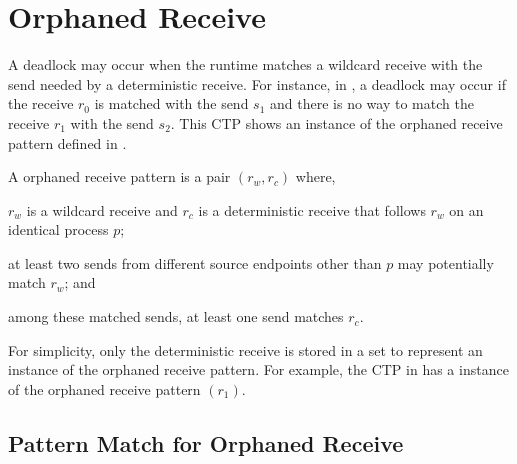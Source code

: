 \section{Orphaned Receive}


\examplefigone

A deadlock may occur when the runtime matches a wildcard receive with the send needed by a deterministic receive. For instance, in , a deadlock may occur if the receive $\mathit{r_{0}}$ is matched with the send $\mathit{s_{1}}$ and there is no way to match the receive $\mathit{r_{1}}$ with the send $\mathit{s_{2}}$. This CTP shows an instance of the orphaned receive pattern defined in .

\begin{definition}
A orphaned receive pattern is a pair $(\mathit{r_w}, \mathit{r_c})$ where, 
\begin{compactenum}
\item $\mathit{r_w}$ is a wildcard receive and $\mathit{r_c}$ is a deterministic receive that follows $\mathit{r_w}$ on an identical process $\mathit{p}$;
\item at least two sends from different source endpoints other than $\mathit{p}$ may potentially match $\mathit{r_w}$; and
\item among these matched sends, at least one send matches $\mathit{r_c}$. 
\end{compactenum}
\label{def:mismatch}
\end{definition}

For simplicity, only the deterministic receive is stored in a set to represent an instance of the orphaned receive pattern. For example, the CTP in  has a instance of the orphaned receive pattern $(r_1)$.

\subsection{Pattern Match for Orphaned Receive}

